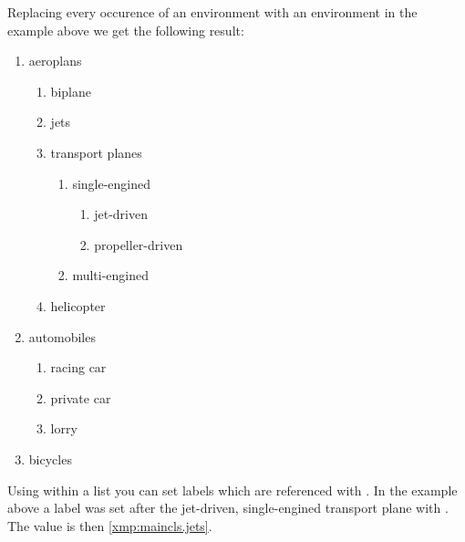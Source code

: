 \begin{Example}
  Replacing every occurence of an  environment
  with an  environment in the example above we
  get the following result:
  \begin{ShowOutput}[\baselineskip]
  \begin{enumerate}
    \item aeroplans
    \begin{enumerate}
      \item biplane
      \item jets
      \item transport planes
      \begin{enumerate}
        \item single-engined
        \begin{enumerate}
          \item{jet-driven}\label{xmp:maincls.jets}
          \item{propeller-driven}
        \end{enumerate}
        \item multi-engined
      \end{enumerate}
      \item helicopter
    \end{enumerate}
    \item automobiles
    \begin{enumerate}
      \item racing car
      \item private car
      \item lorry
    \end{enumerate}
    \item bicycles
  \end{enumerate}
  \end{ShowOutput}
  Using  within a list you can set labels which are
  referenced with . In the example above a label
  was set after the jet-driven, single-engined transport plane with
  . The  value is then
  \ref{xmp:maincls.jets}.
\end{Example}
%
%
%
%
%
%
%
%
%
%
%



